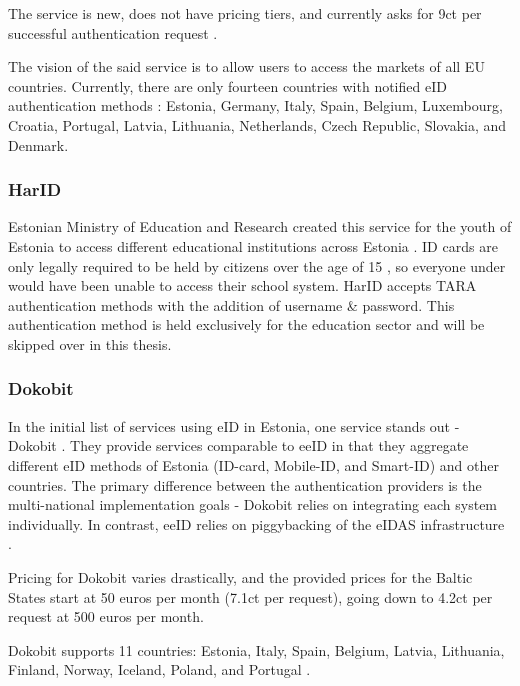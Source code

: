 The service is new, does not have pricing tiers, and currently asks for 9ct per successful authentication request \cite{eeid-pricing}.

The vision of the said service is to allow users to access the markets of all EU countries. Currently, there are only fourteen countries with notified eID authentication methods \cite{eulaw-eidas-notified}: Estonia, Germany, Italy, Spain, Belgium, Luxembourg, Croatia, Portugal, Latvia, Lithuania, Netherlands, Czech Republic, Slovakia, and Denmark.

\subsubsection{HarID}

Estonian Ministry of Education and Research created this service for the youth of Estonia to access different educational institutions across Estonia \cite{harid}. ID cards are only legally required to be held by citizens over the age of 15 \cite{eelaw-idcard}, so everyone under would have been unable to access their school system. HarID accepts TARA authentication methods with the addition of username \& password. This authentication method is held exclusively for the education sector and will be skipped over in this thesis.

\subsubsection{Dokobit}

In the initial list of services using eID in Estonia, one service stands out - Dokobit \cite{dokobit}. They provide services comparable to eeID in that they aggregate different eID methods of Estonia (ID-card, Mobile-ID, and Smart-ID) and other countries. The primary difference between the authentication providers is the multi-national implementation goals - Dokobit relies on integrating each system individually. In contrast, eeID relies on piggybacking of the eIDAS infrastructure \cite{eeid}.

Pricing for Dokobit varies drastically, and the provided prices for the Baltic States \cite{dokobit-pricing} start at 50 euros per month (7.1ct per request), going down to 4.2ct per request at 500 euros per month.

Dokobit supports 11 countries: Estonia, Italy, Spain, Belgium, Latvia, Lithuania, Finland, Norway, Iceland, Poland, and Portugal \cite{dokobit}.

